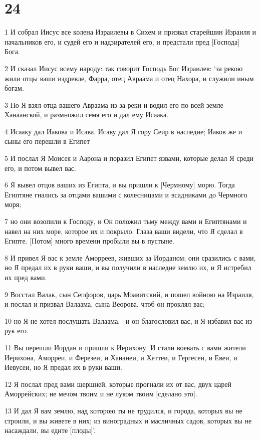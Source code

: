 \chapter{24}

\par 1 И собрал Иисус все колена Израилевы в Сихем и призвал старейшин Израиля и начальников его, и судей его и надзирателей его, и предстали пред [Господа] Бога.
\par 2 И сказал Иисус всему народу: так говорит Господь Бог Израилев: `за рекою жили отцы ваши издревле, Фарра, отец Авраама и отец Нахора, и служили иным богам.
\par 3 Но Я взял отца вашего Авраама из-за реки и водил его по всей земле Ханаанской, и размножил семя его и дал ему Исаака.
\par 4 Исааку дал Иакова и Исава. Исаву дал Я гору Сеир в наследие; Иаков же и сыны его перешли в Египет
\par 5 И послал Я Моисея и Аарона и поразил Египет язвами, которые делал Я среди его, и потом вывел вас.
\par 6 Я вывел отцов ваших из Египта, и вы пришли к [Чермному] морю. Тогда Египтяне гнались за отцами вашими с колесницами и всадниками до Чермного моря;
\par 7 но они возопили к Господу, и Он положил тьму между вами и Египтянами и навел на них море, которое их и покрыло. Глаза ваши видели, что Я сделал в Египте. [Потом] много времени пробыли вы в пустыне.
\par 8 И привел Я вас к земле Аморреев, живших за Иорданом; они сразились с вами, но Я предал их в руки ваши, и вы получили в наследие землю их, и Я истребил их пред вами.
\par 9 Восстал Валак, сын Сепфоров, царь Моавитский, и пошел войною на Израиля, и послал и призвал Валаама, сына Веорова, чтоб он проклял вас;
\par 10 но Я не хотел послушать Валаама, --и он благословил вас, и Я избавил вас из рук его.
\par 11 Вы перешли Иордан и пришли к Иерихону. И стали воевать с вами жители Иерихона, Аморреи, и Ферезеи, и Хананеи, и Хеттеи, и Гергесеи, и Евеи, и Иевусеи, но Я предал их в руки ваши.
\par 12 Я послал пред вами шершней, которые прогнали их от вас, двух царей Аморрейских; не мечом твоим и не луком твоим [сделано это].
\par 13 И дал Я вам землю, над которою ты не трудился, и города, которых вы не строили, и вы живете в них; из виноградных и масличных садов, которых вы не насаждали, вы едите [плоды]'.
